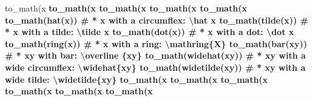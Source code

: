 \documentclass[
]{krantz}
\makeatletter
\newenvironment{Shaded}{\begin{snugshade}}{\end{snugshade}}
\newcommand{\CommentTok}[1]{\textcolor[rgb]{0.56,0.35,0.01}{\textit{#1}}}
\newcommand{\KeywordTok}[1]{\textcolor[rgb]{0.13,0.29,0.53}{\textbf{#1}}}
\newcommand{\NormalTok}[1]{#1}
\newcommand{\OperatorTok}[1]{\textcolor[rgb]{0.81,0.36,0.00}{\textbf{#1}}}
\newcommand{\StringTok}[1]{\textcolor[rgb]{0.31,0.60,0.02}{#1}}
\newenvironment{kframe}{%
\medskip{}
\setlength{\fboxsep}{.8em}
 \def\at@end@of@kframe{}%
 \ifinner\ifhmode%
  \def\at@end@of@kframe{\end{minipage}}%
  \begin{minipage}{\columnwidth}%
 \fi\fi%
 \def\FrameCommand##1{\hskip\@totalleftmargin \hskip-\fboxsep
 \colorbox{shadecolor}{##1}\hskip-\fboxsep
     \hskip-\linewidth \hskip-\@totalleftmargin \hskip\columnwidth}%
 \MakeFramed {\advance\hsize-\width
   \@totalleftmargin\z@ \linewidth\hsize
   \@setminipage}}%
 {\par\unskip\endMakeFramed%
 \at@end@of@kframe}
\renewenvironment{Shaded}{\begin{kframe}}{\end{kframe}}
\renewcommand{\KeywordTok} [1]{\textcolor[rgb]{0.00,0.44,0.13}{{#1}}}
\renewcommand{\StringTok}  [1]{\textcolor[rgb]{0.25,0.44,0.63}{{#1}}}
\renewcommand{\CommentTok} [1]{\textcolor[rgb]{0.38,0.63,0.69}{{#1}}}
\renewcommand{\NormalTok}  [1]{{#1}}
\makeatother
\begin{document}
\begin{Shaded}
\begin{Highlighting}[]
{{{{{{{{{{{\KeywordTok{to_math}\NormalTok{(x }\OperatorTok{%
\KeywordTok{to_math}\NormalTok{(x }\OperatorTok{%
\KeywordTok{to_math}\NormalTok{(x }\OperatorTok{%
\KeywordTok{to_math}\NormalTok{(x }\OperatorTok{%
\KeywordTok{to_math}\NormalTok{(x }\OperatorTok{%
\KeywordTok{to_math}\NormalTok{(}\KeywordTok{hat}\NormalTok{(x))          }\CommentTok{# * x with a circumflex: \textbackslash{}hat x}
\KeywordTok{to_math}\NormalTok{(}\KeywordTok{tilde}\NormalTok{(x))        }\CommentTok{# * x with a tilde: \textbackslash{}tilde x}
\KeywordTok{to_math}\NormalTok{(}\KeywordTok{dot}\NormalTok{(x))          }\CommentTok{# * x with a dot: \textbackslash{}dot x}
\KeywordTok{to_math}\NormalTok{(}\KeywordTok{ring}\NormalTok{(x))         }\CommentTok{# * x with a ring: \textbackslash{}mathring\{X\}}
\KeywordTok{to_math}\NormalTok{(}\KeywordTok{bar}\NormalTok{(xy))         }\CommentTok{# * xy with bar: \textbackslash{}overline \{xy\}}
\KeywordTok{to_math}\NormalTok{(}\KeywordTok{widehat}\NormalTok{(xy))     }\CommentTok{# * xy with a wide circumflex: \textbackslash{}widehat\{xy\}}
\KeywordTok{to_math}\NormalTok{(}\KeywordTok{widetilde}\NormalTok{(xy))   }\CommentTok{# * xy with a wide tilde: \textbackslash{}widetilde\{xy\}}
\KeywordTok{to_math}\NormalTok{(x }\OperatorTok{%
\KeywordTok{to_math}\NormalTok{(x }\OperatorTok{%
\KeywordTok{to_math}\NormalTok{(x }\OperatorTok{%
\KeywordTok{to_math}\NormalTok{(x }\OperatorTok{%
\KeywordTok{to_math}\NormalTok{(x }\OperatorTok{%
\KeywordTok{to_math}\NormalTok{(x }\OperatorTok{%
}}}}}}}}}}}}}}}}}}}}}}
\end{Highlighting}
\end{Shaded}
\end{document}
